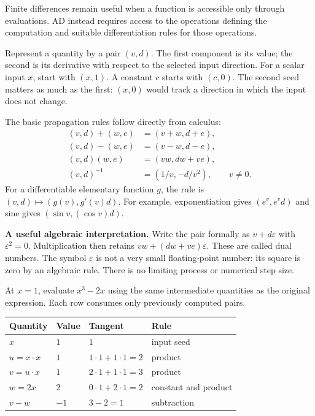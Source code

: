 Finite differences remain useful when a function is accessible only through
evaluations. AD instead requires access to the operations defining the
computation and suitable differentiation rules for those operations.

\newpage
{}
Represent a quantity by a pair $(v,d)$. The first component is its value;
the second is its derivative with respect to the selected input direction.
For a scalar input $x$, start with $(x,1)$. A constant $c$ starts with $(c,0)$.
The second seed matters as much as the first: $(x,0)$ would track a direction
in which the input does not change.

The basic propagation rules follow directly from calculus:
\[
\begin{aligned}
 (v,d)+(w,e)&=(v+w,d+e),\\
 (v,d)-(w,e)&=(v-w,d-e),\\
 (v,d)(w,e)&=(vw,dw+ve),\\
 (v,d)^{-1}&=(1/v,-d/v^2),\qquad v\ne0.
\end{aligned}
\]
For a differentiable elementary function $g$, the rule is
$(v,d)\mapsto(g(v),g'(v)d)$. For example, exponentiation gives
$(e^v,e^vd)$ and sine gives $(\sin v,(\cos v)d)$.

\textbf{A useful algebraic interpretation.} Write the pair formally as
$v+d\varepsilon$ with $\varepsilon^2=0$. Multiplication then retains
$vw+(dw+ve)\varepsilon$. These are called dual numbers. The symbol
$\varepsilon$ is not a very small floating-point number: its square is zero
by an algebraic rule. There is no limiting process or numerical step size.

At $x=1$, evaluate $x^3-2x$ using the same intermediate quantities as the
original expression. Each row consumes only previously computed pairs.
\begin{center}
\begin{tabular}{llll}
\toprule
Quantity & Value & Tangent & Rule\\
\midrule
$x$ & $1$ & $1$ & input seed\\
$u=x\cdot x$ & $1$ & $1\cdot1+1\cdot1=2$ & product\\
$v=u\cdot x$ & $1$ & $2\cdot1+1\cdot1=3$ & product\\
$w=2x$ & $2$ & $0\cdot1+2\cdot1=2$ & constant and product\\
$v-w$ & $-1$ & $3-2=1$ & subtraction\\
\bottomrule
\end{tabular}
\end{center}

